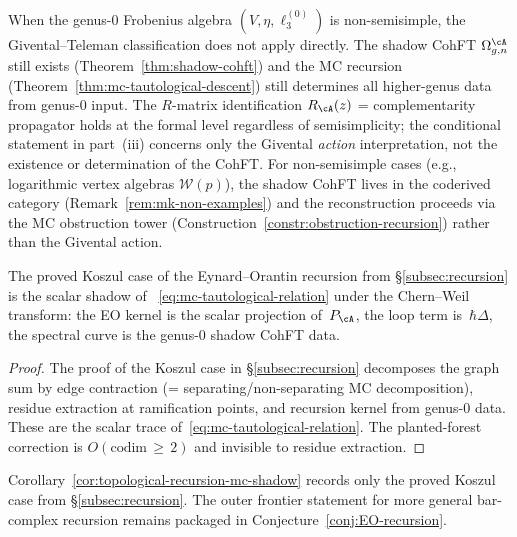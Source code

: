 \begin{remark}
\label{rem:non-semisimple-cohft}
When the genus-$0$ Frobenius algebra $(V, \eta, \ell_3^{(0)})$ is
non-semisimple, the Givental--Teleman classification does not apply
directly.  The shadow CohFT $\Omega_{g,n}^{\cA}$ still exists
(Theorem~\ref{thm:shadow-cohft}) and the MC recursion
(Theorem~\ref{thm:mc-tautological-descent}) still determines all
higher-genus data from genus-$0$ input.  The $R$-matrix
identification $R_\cA(z)$ = complementarity propagator holds at the
formal level regardless of semisimplicity; the conditional statement
in part~(iii) concerns only the Givental \emph{action} interpretation,
not the existence or determination of the CohFT.  For non-semisimple
cases (e.g., logarithmic vertex algebras $\mathcal{W}(p)$), the shadow
CohFT lives in the coderived category
(Remark~\ref{rem:mk-non-examples}) and the reconstruction proceeds
via the MC obstruction tower
(Construction~\ref{constr:obstruction-recursion}) rather than
the Givental action.
\end{remark}

\begin{corollary}
\label{cor:topological-recursion-mc-shadow}
\ClaimStatusProvedHere
{}
The proved Koszul case of the Eynard--Orantin recursion from
\S\ref{subsec:recursion} is the scalar shadow of
~\eqref{eq:mc-tautological-relation} under the Chern--Weil transform:
the EO kernel is the scalar projection of~$P_\cA$,
the loop term is~$\hbar\Delta$,
the spectral curve is the genus-$0$ shadow CohFT data.
\end{corollary}

\begin{proof}
The proof of the Koszul case in \S\ref{subsec:recursion} decomposes the
graph sum by
edge contraction (= separating/non-separating MC decomposition),
residue extraction at ramification points, and
recursion kernel from genus-$0$ data.
These are the scalar trace of~\eqref{eq:mc-tautological-relation}.
The planted-forest correction is
$O(\mathrm{codim}\, {\geq}\, 2)$ and invisible to residue extraction.
\end{proof}

\begin{remark}
\label{rem:topological-recursion-mc-shadow-frontier}
Corollary~\ref{cor:topological-recursion-mc-shadow} records only the
proved Koszul case from \S\ref{subsec:recursion}.  The outer
frontier statement for more general bar-complex recursion remains
packaged in Conjecture~\ref{conj:EO-recursion}.
\end{remark}

